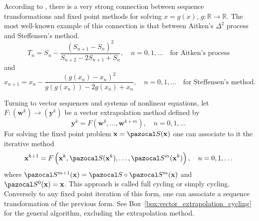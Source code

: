 According to \cite{brezinski_extrapolation_2013}, there is a very strong connection between sequence transformations and fixed point methods for solving \(x= g( x)\), \(g\colon \mathbb R\to \mathbb R\).
The most well-known example of this connection is that between Aitken's \(\Delta^{2}\) process and Steffensen's method.
\begin{equation}
T_{n}=S_{n}-\frac{\left(S_{n+1}-S_{n}\right)^{2}}{S_{n+2}-2 S_{n+1}+S_{n}}, \quad n=0,1, \ldots \quad\text{for Aitken's process}
\end{equation}
and
\begin{equation}
x_{n+1}=x_{n}-\frac{\left(g\left(x_{n}\right)-x_{n}\right)^{2}}{g\left(g\left(x_{n}\right)\right)-2 g\left(x_{n}\right)+x_{n}},\quad n=0,1, \ldots \quad\text{for Steffensen's method.}
\end{equation}

Turning to vector sequences and systems of nonlinear equations, let \(F:(\mathbf w^{k}) \to(\mathbf y^{k})\) be a vector extrapolation method defined by
\begin{equation}
\mathbf y^k = F\left(\mathbf w^{k}, \ldots, \mathbf w^{k+m}\right), \quad n=0,1, \ldots
\end{equation}
For solving the fixed point problem \(\mathbf x=\pazocal S(\mathbf x)\) one can associate to it the iterative method
\begin{equation}
\mathbf x^{k+1}=F\left(\mathbf x^{k}, \pazocal S(\mathbf x^{k}), \ldots, \pazocal S^{m}(\mathbf x^{k})\right), \quad n=0,1, \ldots
\end{equation}
where \(\pazocal S^{m+1}(\mathbf x)=\pazocal S \circ \pazocal S^{m}(\mathbf x)\) and \(\pazocal S^{0}(\mathbf x)=\mathbf x\).
This approach is called full cycling or simply cycling.
Conversely to any fixed point iteration of this form, one can associate a sequence transformation of the previous form.
See Box~\ref{box:vector_extrapolation_cycling} for the general algorithm, excluding the extrapolation method.

